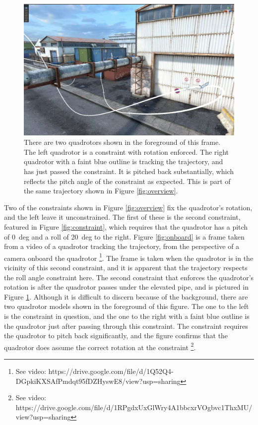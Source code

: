 \documentclass[pageno]{jpaper}
\begin{document}
\begin{figure}
  \centering
  \includegraphics[width=0.75\linewidth]{data/rotation.png}
  \caption{There are two quadrotors shown in the foreground of this frame. The left quadrotor is a constraint with rotation enforced. The right quadrotor with a faint blue outline is tracking the trajectory, and has just passed the constraint. It is pitched back substantially, which reflects the pitch angle of the constraint as expected. This is part of the same trajectory shown in Figure \ref{fig:overview}.}
  \label{fig:rotation}
\end{figure}

Two of the constraints shown in Figure \ref{fig:overview} fix the quadrotor's rotation, and the left leave it unconstrained. The first of these is the second constraint, featured in Figure \ref{fig:constraint}, which requires that the quadrotor has a pitch of \qty{0}{deg} and a roll of \qty{20}{deg} to the right. Figure \ref{fig:onboard} is a frame taken from a video of a quadrotor tracking the trajectory, from the perspective of a camera onboard the quadrotor \footnote{See video: https://drive.google.com/file/d/1Q52Q4-DGpkiKXSAfPmdqt95fDZHyswE8/view?usp=sharing}. The frame is taken when the quadrotor is in the vicinity of this second constraint, and it is apparent that the trajectory respects the roll angle constraint here. The second constraint that enforces the quadrotor's rotation is after the quadrotor passes under the elevated pipe, and is pictured in Figure \ref{fig:rotation}. Although it is difficult to discern because of the background, there are two quadrotor models shown in the foreground of this figure. The one to the left is the constraint in question, and the one to the right with a faint blue outline is the quadrotor just after passing through this constraint. The constraint requires the quadrotor to pitch back significantly, and the figure confirms that the quadrotor does assume the correct rotation at the constraint \footnote{See video: https://drive.google.com/file/d/1RPgdxUxGlWry4A1bbcxrVOgbvc1ThxMU/view?usp=sharing}.
\end{document}
